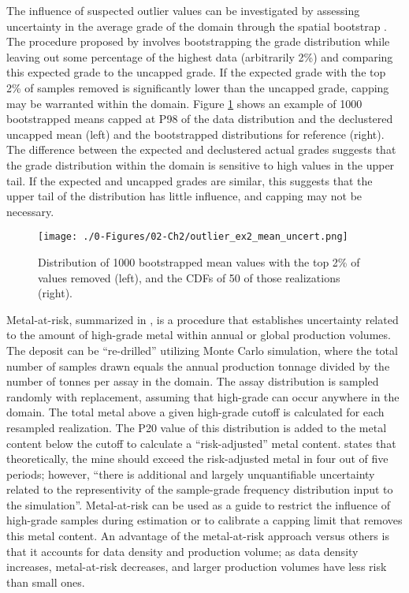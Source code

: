 The influence of suspected outlier values can be investigated by assessing uncertainty in the average grade of the domain through the spatial bootstrap \citep{solow1985bootstrapping}. The procedure proposed by \cite{nowak2013suggestions} involves bootstrapping the grade distribution while leaving out some percentage of the highest data (arbitrarily 2\%) and comparing this expected grade to the uncapped grade. If the expected grade with the top 2\% of samples removed is significantly lower than the uncapped grade, capping may be warranted within the domain. Figure \ref{fig:outlier_ex2_mean_uncert} shows an example of 1000 bootstrapped means capped at P98 of the data distribution and the declustered uncapped mean (left) and the bootstrapped distributions for reference (right). The difference between the expected and declustered actual grades suggests that the grade distribution within the domain is sensitive to high values in the upper tail. If the expected and uncapped grades are similar, this suggests that the upper tail of the distribution has little influence, and capping may not be necessary.

\begin{figure}[htb!]
    \centering
    \texttt{[image: ./0-Figures/02-Ch2/outlier\_ex2\_mean\_uncert.png]}
    \caption{Distribution of 1000 bootstrapped mean values with the top 2\% of values removed (left), and the \glspl{CDF} of 50 of those realizations (right). }
    \label{fig:outlier_ex2_mean_uncert}
\end{figure}

Metal-at-risk, summarized in \cite{parker2006}, is a procedure that establishes uncertainty related to the amount of high-grade metal within annual or global production volumes. The deposit can be ``re-drilled'' utilizing Monte Carlo simulation, where the total number of samples drawn equals the annual production tonnage divided by the number of tonnes per assay in the domain. The assay distribution is sampled randomly with replacement, assuming that high-grade can occur anywhere in the domain. The total metal above a given high-grade cutoff is calculated for each resampled realization. The P20 value of this distribution is added to the metal content below the cutoff to calculate a ``risk-adjusted'' metal content. \cite{parker2006} states that theoretically, the mine should exceed the risk-adjusted metal in four out of five periods; however, ``there is additional and largely unquantifiable uncertainty related to the representivity of the sample-grade frequency distribution input to the simulation''. Metal-at-risk can be used as a guide to restrict the influence of high-grade samples during estimation or to calibrate a capping limit that removes this metal content. An advantage of the metal-at-risk approach versus others is that it accounts for data density and production volume; as data density increases, metal-at-risk decreases, and larger production volumes have less risk than small ones.

